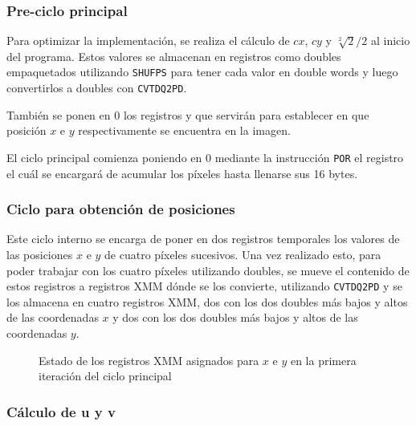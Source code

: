 \subsubsection{Pre-ciclo principal}

Para optimizar la implementación, se realiza el cálculo de $cx$, $cy$ y $\sqrt[2]{2}/2$ al inicio del programa. Estos valores se almacenan en registros como doubles empaquetados utilizando \texttt{SHUFPS} para tener cada valor en double words y luego convertirlos a doubles con \texttt{CVTDQ2PD}.

También se ponen en 0 los registros  y  que servirán para establecer en que posición $x$ e $y$ respectivamente se encuentra en la imagen.

El ciclo principal comienza poniendo en 0 mediante la instrucción \texttt{POR} el registro  el cuál se encargará de acumular los píxeles hasta llenarse sus 16 bytes.


\subsubsection{Ciclo para obtención de posiciones}

Este ciclo interno se encarga de poner en dos registros temporales los valores de las posiciones $x$ e $y$ de cuatro píxeles sucesivos. Una vez realizado esto, para poder trabajar con los cuatro píxeles utilizando doubles, se mueve el contenido de estos registros a registros XMM dónde se los convierte, utilizando \texttt{CVTDQ2PD} y se los almacena en cuatro registros XMM, dos con los dos doubles más bajos y altos de las coordenadas $x$ y dos con los dos doubles más bajos y altos de las coordenadas $y$.

\begin{figure}[h!]
    \centering
    \caption{Estado de los registros XMM asignados para $x$ e $y$ en la primera iteración del ciclo principal}
\end{figure}


\subsubsection{Cálculo de u y v}

